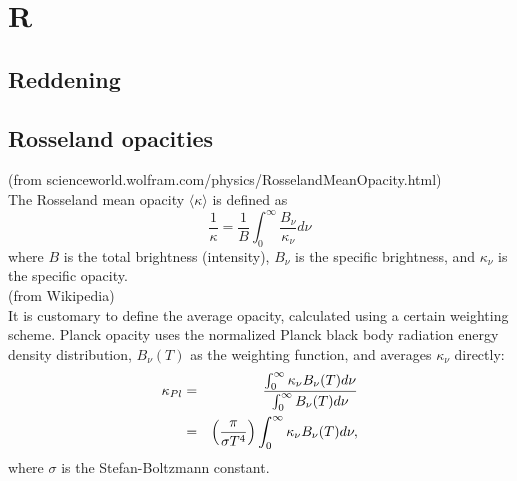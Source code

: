 \documentclass[11pt]{article}
\begin{document}
\section{R}
\subsection{Reddening}

\subsection{Rosseland opacities}
(from scienceworld.wolfram.com/physics/RosselandMeanOpacity.html) \\   	
The Rosseland mean opacity $\langle \kappa \rangle$  is defined as
\begin{equation}
\frac{1}{\kappa} = \frac{1}{B} \int^{\infty}_{0} \frac{B_{\nu}}{\kappa_{\nu}} d\nu
\end{equation}
where $B$ is the total brightness (intensity), $B_{\nu}$ is the
specific brightness, and $\kappa_{\nu}$ is the specific opacity. \\

\noindent
(from Wikipedia) \\
It is customary to define the average opacity, calculated using a
certain weighting scheme. Planck opacity uses the normalized Planck
black body radiation energy density distribution, $B_{\nu }(T)$ as the
weighting function, and averages $\kappa _{\nu}$ directly:
\begin{eqnarray}
\kappa _{Pl} & =& {\int _{0}^{\infty }\kappa _{\nu }B_{\nu }(T)d\nu \over
                  \int _{0}^{\infty }B_{\nu }(T)d\nu } \\ 
                 & = &{\Big (}{\pi \over \sigma
                  T^{4}}{\Big )}\int _{0}^{\infty }\kappa _{\nu }B_{\nu }(T)d\nu ,
\end{eqnarray}
\noindent
where $\sigma$ is the Stefan-Boltzmann constant.\\ 
\end{document}
